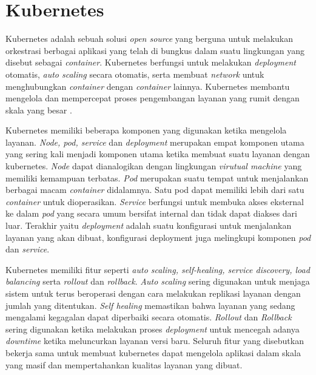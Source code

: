 \section{Kubernetes}

Kubernetes adalah sebuah solusi \textit{open source} yang berguna untuk melakukan orkestrasi berbagai aplikasi yang telah di bungkus dalam suatu lingkungan yang disebut sebagai \textit{container}. Kubernetes berfungsi untuk melakukan \textit{deployment} otomatis, \textit{auto scaling} secara otomatis, serta membuat \textit{network} untuk menghubungkan \textit{container} dengan \textit{container} lainnya. Kubernetes membantu mengelola dan mempercepat proses pengembangan layanan yang rumit dengan skala yang besar \parencite{helmkubernetes}.

Kubernetes memiliki beberapa komponen yang digunakan ketika mengelola layanan. \textit{Node, pod, service} dan \textit{deployment} merupakan empat komponen utama yang sering kali menjadi komponen utama ketika membuat suatu layanan dengan kubernetes. \textit{Node} dapat dianalogikan dengan lingkungan \textit{virutual machine} yang memiliki kemampuan terbatas. \textit{Pod} merupakan suatu tempat untuk menjalankan berbagai macam \textit{container} didalamnya. Satu pod dapat memiliki lebih dari satu \textit{container} untuk dioperasikan. \textit{Service} berfungsi untuk membuka akses eksternal ke dalam \textit{pod} yang secara umum bersifat internal dan tidak dapat diakses dari luar. Terakhir yaitu \textit{deployment} adalah suatu konfigurasi untuk menjalankan layanan yang akan dibuat, konfigurasi deployment juga melingkupi komponen \textit{pod} dan \textit{service}.

Kubernetes memiliki fitur seperti \textit{auto scaling, self-healing, service discovery, load balancing} serta \textit{rollout} dan \textit{rollback}. \textit{Auto scaling} sering digunakan untuk menjaga sistem untuk terus beroperasi dengan cara melakukan replikasi layanan dengan jumlah yang ditentukan. \textit{Self healing} memastikan bahwa layanan yang sedang mengalami kegagalan dapat diperbaiki secara otomatis. \textit{Rollout} dan \textit{Rollback} sering digunakan ketika melakukan proses \textit{deployment} untuk mencegah adanya \textit{downtime} ketika meluncurkan layanan versi baru. Seluruh fitur yang disebutkan bekerja sama untuk membuat kubernetes dapat mengelola aplikasi dalam skala yang masif dan mempertahankan kualitas layanan yang dibuat.


